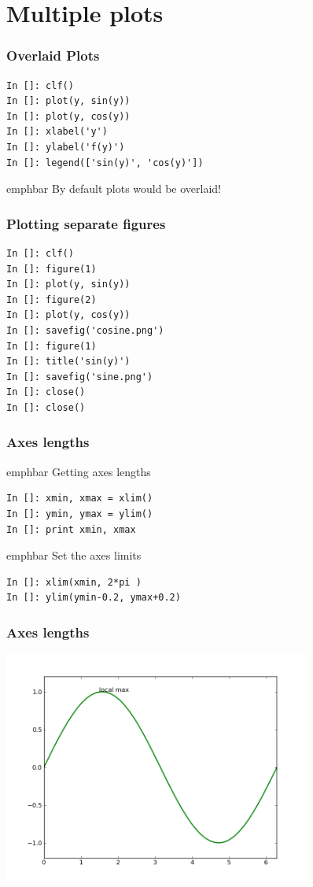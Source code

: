 \documentclass[14pt,compress]{beamer}
\newcommand{\emphbar}[1]
{\begin{beamercolorbox}[rounded=true]{emphbar} 
      {#1}
 \end{beamercolorbox}
}
\begin{document}
\section{Multiple plots}
\begin{frame}[fragile]
\frametitle{Overlaid Plots}
\begin{lstlisting}
In []: clf()
In []: plot(y, sin(y))
In []: plot(y, cos(y))
In []: xlabel('y')
In []: ylabel('f(y)')
In []: legend(['sin(y)', 'cos(y)']) 
\end{lstlisting}
\emphbar{By default plots would be overlaid!}
\end{frame}

\begin{frame}[fragile]
\frametitle{Plotting separate figures}
\begin{lstlisting}
In []: clf()
In []: figure(1)
In []: plot(y, sin(y))
In []: figure(2)
In []: plot(y, cos(y))
In []: savefig('cosine.png')
In []: figure(1)
In []: title('sin(y)')
In []: savefig('sine.png')
In []: close()
In []: close()
\end{lstlisting}
\end{frame}

\begin{frame}[fragile]
\frametitle{Axes lengths}
\emphbar{Getting axes lengths}
  \begin{lstlisting}
In []: xmin, xmax = xlim() 
In []: ymin, ymax = ylim() 
In []: print xmin, xmax 
  \end{lstlisting}
\emphbar{Set the axes limits}
  \begin{lstlisting}
In []: xlim(xmin, 2*pi )
In []: ylim(ymin-0.2, ymax+0.2)
  \end{lstlisting}
\end{frame}

\begin{frame}[fragile]
  \frametitle{Axes lengths}
  \begin{center}
    \includegraphics[height=3in, interpolate=true]{data/limits}
  \end{center}
\end{frame}
\end{document}
